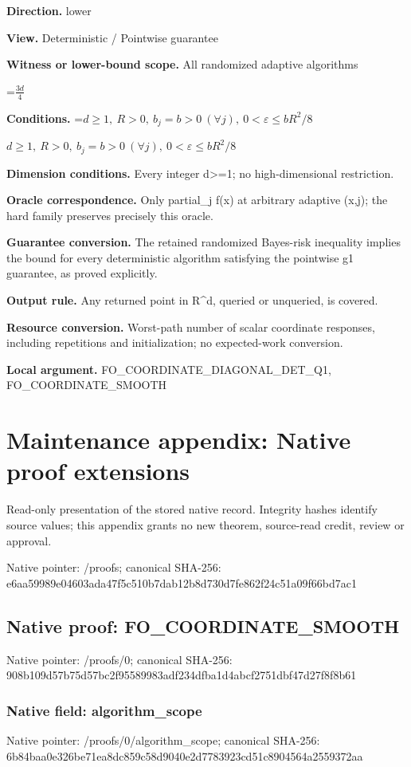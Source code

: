 \documentclass[10pt,a4paper]{article}
\newcommand{\AtlasMath}[1]{\par\begingroup\centering\setbox0=\hbox{$\displaystyle #1$}\ifdim\wd0>1.4\linewidth\typeout{ATLAS WIDE FORMULA: \the\wd0}\fi\ifdim\wd0>\linewidth\resizebox{\linewidth}{!}{\box0}\else\box0\fi\par\endgroup}
\newcommand{\AtlasInlineMath}[1]{\begingroup\setbox0=\hbox{$#1$}\ifdim\wd0>.4\linewidth\endgroup\AtlasMath{#1}\else\endgroup$#1$\fi}
\begin{document}
\textbf{Direction.} lower

\textbf{View.} Deterministic / Pointwise guarantee

\textbf{Witness or lower-bound scope.} All randomized adaptive algorithms

\AtlasMath{\frac{3d}{4}}
\textbf{Conditions.} \AtlasInlineMath{d\ge1,\ R>0,\ b_j=b>0\ (\forall j),\ 0<\varepsilon\le bR^2/8}

\textbf{Dimension conditions.} Every integer d>=1; no high-dimensional restriction.

\textbf{Oracle correspondence.} Only partial\_\allowbreak{}j f(x) at arbitrary adaptive (x,j); the hard family preserves precisely this oracle.

\textbf{Guarantee conversion.} The retained randomized Bayes-risk inequality implies the bound for every deterministic algorithm satisfying the pointwise g1 guarantee, as proved explicitly.

\textbf{Output rule.} Any returned point in R\textasciicircum{}d, queried or unqueried, is covered.

\textbf{Resource conversion.} Worst-path number of scalar coordinate responses, including repetitions and initialization; no expected-work conversion.

\textbf{Local argument.} FO\_\allowbreak{}COORDINATE\_\allowbreak{}DIAGONAL\_\allowbreak{}DET\_\allowbreak{}Q1, FO\_\allowbreak{}COORDINATE\_\allowbreak{}SMOOTH

\section{Maintenance appendix: Native proof extensions}
Read-only presentation of the stored native record. Integrity hashes identify source values; this appendix grants no new theorem, source-read credit, review or approval.

Native pointer: /proofs; canonical SHA-256: e6aa59989e04603ada47f5c510b7dab12b8d730d7fe862f24c51a09f66bd7ac1

\subsection{Native proof: FO\_\allowbreak{}COORDINATE\_\allowbreak{}SMOOTH}
Native pointer: /proofs/0; canonical SHA-256: 908b109d57b75d57bc2f95589983adf234dfba1d4abcf2751dbf47d27f8f8b61

\subsubsection{Native field: algorithm\_\allowbreak{}scope}
Native pointer: /proofs/0/algorithm\_\allowbreak{}scope; canonical SHA-256: 6b84baa0e326be71ea8dc859c58d9040e2d7783923cd51c8904564a2559372aa
\end{document}
